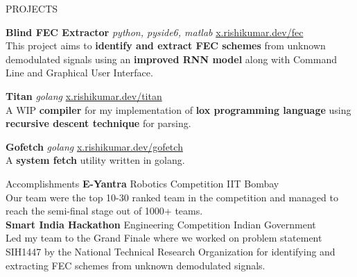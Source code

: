\documentclass{resume} %
\begin{document}
	\begin{rSection}{PROJECTS}
		\vspace{-1.25em}
		\item \textbf{Blind FEC Extractor} \textit{python, pyside6, matlab} \hfill {\href{https://x.rishikumar.dev/fec}{x.rishikumar.dev/fec}}\\
			{This project aims to \textbf{identify and extract FEC schemes} from unknown demodulated signals using an \textbf{improved RNN model} along with Command Line and Graphical User Interface.}
		\item \textbf{Titan} \textit{golang} \hfill {\href{https://x.rishikumar.dev/titan}{x.rishikumar.dev/titan}}\\
			{A WIP \textbf{compiler} for my implementation of \textbf{lox programming language} using \textbf{recursive descent technique}  for parsing.}
		\item \textbf{Gofetch} \textit{golang} \hfill {\href{https://x.rishikumar.dev/gofetch}{x.rishikumar.dev/gofetch}}\\
			{A \textbf{system fetch} utility written in golang.}
	\end{rSection} 


	
	\begin{rSection}{Accomplishments} 
		\textbf{E-Yantra} {Robotics Competition} \hfill IIT Bombay\\
		{Our team were the top 10-30 ranked team in the competition and managed to reach the semi-final stage out of 1000+ teams.}\\	
		\textbf{Smart India Hackathon} {Engineering Competition} \hfill Indian Government\\
		{Led my team to the Grand Finale where we worked on problem statement SIH1447 by the National
Technical Research Organization for identifying and extracting FEC schemes from unknown demodulated signals.} 	
	\end{rSection}
\end{document}
